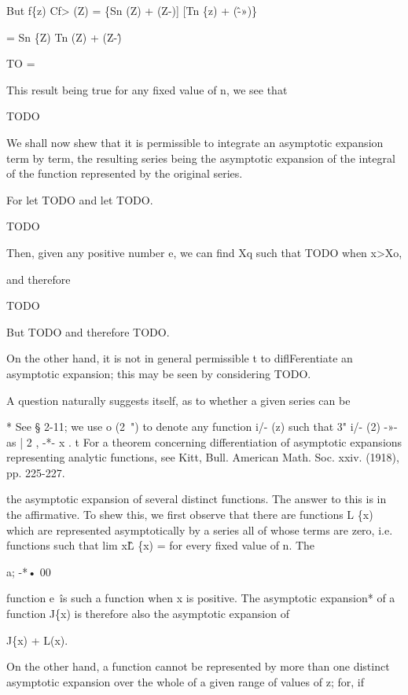 But f\{z) Cf> (Z) = \{Sn (Z) + (Z-)] [Tn \{z) + (\^-»)\}

= Sn \{Z) Tn (Z) + (Z-\^)

TO =

This result being true for any fixed value of n, we see that

TODO


We shall now shew that it is permissible to integrate an asymptotic
expansion term by term, the resulting series being the asymptotic
expansion of the integral of the function represented by the original
series.

For let TODO and let TODO.

TODO

Then, given any positive number e, we can find Xq such that TODO when
x>Xo,

and therefore

TODO

But TODO and therefore TODO.

On the other hand, it is not in general permissible t to
diflFerentiate an asymptotic expansion; this may be seen by
considering TODO.


A question naturally suggests itself, as to whether a given series can
be

* See § 2-11; we use o (2~") to denote any function i/- (z) such that
3" i/- (2) -»- as | 2 , -*- x . t For a theorem concerning
differentiation of asymptotic expansions representing analytic
functions, see Kitt, Bull. American Math. Soc. xxiv. (1918), pp.
225-227.

%
%

the asymptotic expansion of several distinct functions. The answer to
this is in the affirmative. To shew this, we first observe that there
are functions L \{x) which are represented asymptotically by a series
all of whose terms are zero, i.e. functions such that lim x\^L \{x) =
for every fixed value of n. The

a; -*• 00

function e~\^ is such a function when x is positive. The asymptotic
expansion* of a function J\{x) is therefore also the asymptotic
expansion of

J\{x) + L(x).

On the other hand, a function cannot be represented by more than one
distinct asymptotic expansion over the whole of a given range of
values of z; for, if

